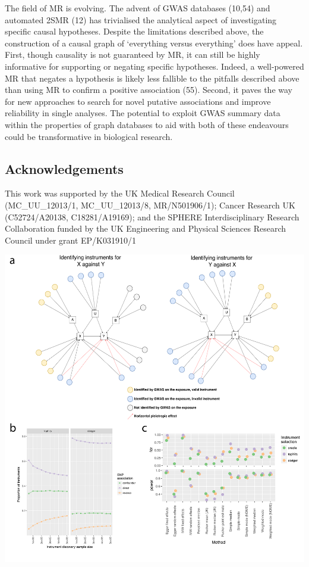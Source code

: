 \documentclass[]{article}
\begin{document}
The field of MR is evolving. The advent of GWAS databases (10,54) and
automated 2SMR (12) has trivialised the analytical aspect of
investigating specific causal hypotheses. Despite the limitations
described above, the construction of a causal graph of `everything
versus everything' does have appeal. First, though causality is not
guaranteed by MR, it can still be highly informative for supporting or
negating specific hypotheses. Indeed, a well-powered MR that negates a
hypothesis is likely less fallible to the pitfalls described above than
using MR to confirm a positive association (55). Second, it paves the
way for new approaches to search for novel putative associations and
improve reliability in single analyses. The potential to exploit GWAS
summary data within the properties of graph databases to aid with both
of these endeavours could be transformative in biological research.

\subsection{Acknowledgements}\label{acknowledgements}

This work was supported by the UK Medical Research Council
(MC\_UU\_12013/1, MC\_UU\_12013/8, MR/N501906/1); Cancer Research UK
(C52724/A20138, C18281/A19169); and the SPHERE Interdisciplinary
Research Collaboration funded by the UK Engineering and Physical
Sciences Research Council under grant EP/K031910/1

\newpage

\includegraphics{images/fig1.pdf}
\end{document}
